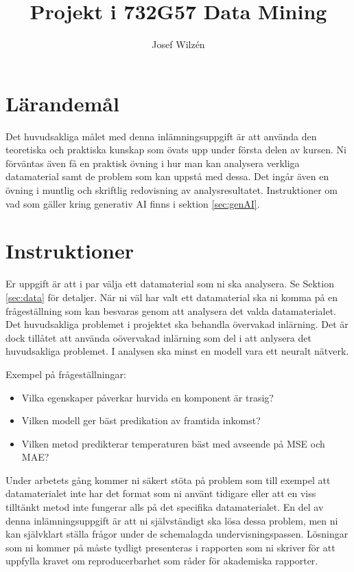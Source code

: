 \documentclass[a4paper]{article}
\title{Projekt i 732G57 Data Mining}
\author{Josef Wilzén}
\begin{document}
\maketitle
\thispagestyle{fancy}


\section{Lärandemål}

Det huvudsakliga målet med denna inlämningsuppgift är att använda den teoretiska och 
praktiska kunskap som övats upp under första delen av kursen. Ni förväntas även få 
en praktisk övning i hur man kan analysera verkliga datamaterial samt de problem som 
kan uppstå med dessa. Det ingår även en övning i muntlig och skriftlig redovisning 
av analysresultatet. Instruktioner om vad som gäller kring generativ AI finns i sektion \ref{sec:genAI}.

\section{Instruktioner}

Er uppgift är att i par välja ett datamaterial som ni ska analysera. Se Sektion \ref{sec:data} för detaljer. När ni väl har valt ett datamaterial ska ni komma på en frågeställning som kan besvaras genom att analysera det valda datamaterialet. Det huvudsakliga problemet i projektet ska behandla övervakad inlärning. Det är dock tillåtet att använda oövervakad inlärning som del i att anlysera det huvudsakliga problemet. I analysen ska minst en modell vara ett neuralt nätverk.

Exempel på frågeställningar:
\begin{itemize}
    \item Vilka egenskaper påverkar hurvida en komponent är trasig? 
    \item Vilken modell ger bäst predikation av framtida inkomst?
    \item Vilken metod predikterar temperaturen bäst med avseende på MSE och MAE?
\end{itemize}
Under arbetets gång kommer ni säkert stöta på problem som till exempel att datamaterialet inte har det format som ni använt tidigare eller att en viss tilltänkt metod inte fungerar alls på det specifika datamaterialet. En del av denna inlämningsuppgift är att ni självständigt ska lösa dessa problem, men ni kan självklart ställa frågor under de schemalagda undervisningspassen. Lösningar som ni kommer på måste tydligt presenteras i rapporten som ni skriver för att uppfylla kravet om reproducerbarhet som råder för akademiska rapporter.
\end{document}
